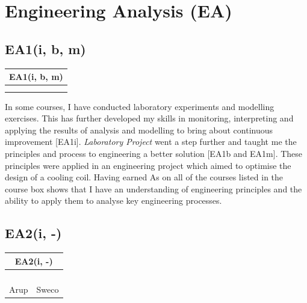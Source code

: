 
\section{Engineering Analysis (EA)} \label{EA}

\subsection*{EA1(i, b, m)} 

\begin{table}
	\begin{tabular}{|ll|}
		\hline
		\multicolumn{2}{|c|}{\cellcolor[HTML]{F8A102}\textbf{EA1(i, b, m) \nomaster}} \\ \hline
		\EPA & \DSA \\
		\TPS & \LAB \\ \hline
	\end{tabular}
\end{table}

In some courses, I have conducted laboratory experiments and modelling exercises.
This has further developed my skills in monitoring, interpreting and applying the results of analysis and modelling to bring about continuous improvement [EA1i].
\textit{Laboratory Project} went a step further and taught me the principles and process to engineering a better solution [EA1b and EA1m].
These principles were applied in an engineering project which aimed to optimise the design of a cooling coil.
Having earned As on all of the courses listed in the course box shows that I have an understanding of engineering principles and the ability to apply them to analyse key engineering processes.








\subsection*{EA2(i, -)}

\begin{table}
	\begin{tabular}{|ll|}
		\hline
		\multicolumn{2}{|c|}{\cellcolor[HTML]{F8A102}\textbf{EA2(i, -) \nomaster}} \\ \hline
		\ConTechOne & \Acoustics \\
		\HYD & \EPA \\
		\TPS & \PRJ \\
		\LAB &  \\
		Arup & Sweco \\ \hline
	\end{tabular}
\end{table}

